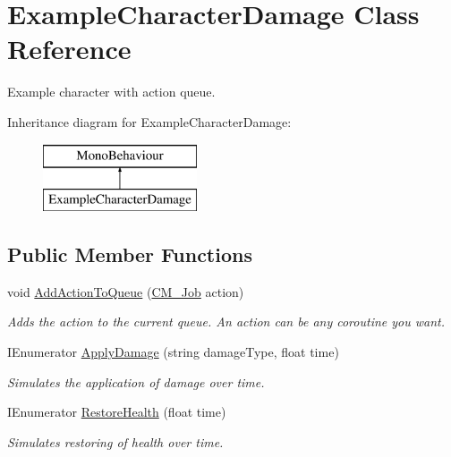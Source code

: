 \hypertarget{class_example_character_damage}{}\section{Example\+Character\+Damage Class Reference}
\label{class_example_character_damage}


Example character with action queue.  


Inheritance diagram for Example\+Character\+Damage\+:\begin{figure}[H]
\begin{center}
\leavevmode
\includegraphics[height=2.000000cm]{class_example_character_damage}
\end{center}
\end{figure}
\subsection*{Public Member Functions}
\begin{DoxyCompactItemize}
\item 
void \hyperlink{class_example_character_damage_a0befb25f1d266a74f6ea9b2bb25b8d6d}{Add\+Action\+To\+Queue} (\hyperlink{class_c_m___job}{C\+M\+\_\+\+Job} action)
\begin{DoxyCompactList}\small\item\em Adds the action to the current queue. An action can be any coroutine you want. \end{DoxyCompactList}\item 
I\+Enumerator \hyperlink{class_example_character_damage_af25a43f4182d205ca89e73d7dc0794f3}{Apply\+Damage} (string damage\+Type, float time)
\begin{DoxyCompactList}\small\item\em Simulates the application of damage over time. \end{DoxyCompactList}\item 
I\+Enumerator \hyperlink{class_example_character_damage_aeb1574e48eac8ed8c211b5ea0d488782}{Restore\+Health} (float time)
\begin{DoxyCompactList}\small\item\em Simulates restoring of health over time. \end{DoxyCompactList}\end{DoxyCompactItemize}
